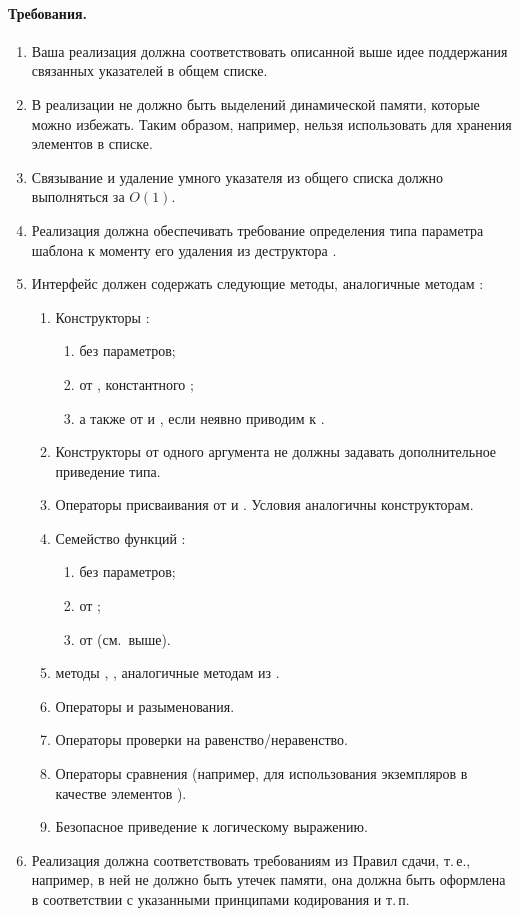 \documentclass[a4paper,10pt]{article}
\begin{document}
\paragraph{Требования.}
\begin{enumerate}
 \item Ваша реализация должна соответствовать описанной выше идее поддержания связанных указателей в общем списке.
 \item В реализации не должно быть выделений динамической памяти, которые можно избежать.
 Таким образом, например, нельзя использовать  для хранения элементов в списке.
 \item Связывание и удаление умного указателя из общего списка должно выполняться за $O(1)$.
 \item Реализация должна обеспечивать требование определения типа параметра шаблона к моменту его удаления из деструктора .
 \item Интерфейс  должен содержать следующие методы, аналогичные методам :
 \begin{enumerate}
  \item Конструкторы :
  \begin{enumerate}
   \item без параметров;
   \item от , константного ;
   \item а также от  и , если  неявно приводим к .
  \end{enumerate}
  \item Конструкторы от одного аргумента не должны задавать дополнительное приведение типа.
  \item Операторы присваивания от  и .
  Условия аналогичны конструкторам.
  \item Семейство функций :
   \begin{enumerate}
    \item без параметров;
    \item от ;
    \item от  (см.~выше).
   \end{enumerate}
  \item методы , ,  аналогичные методам из .
  \item Операторы \cpp{->} и разыменования.
  \item Операторы проверки на равенство/неравенство.
  \item Операторы сравнения (например, для использования экземпляров  в качестве элементов ).
  \item Безопасное приведение к логическому выражению.
 \end{enumerate}
 \item Реализация должна соответствовать требованиям из Правил сдачи,
 т.\,е., например, в ней не должно быть утечек памяти,
 она должна быть оформлена в соответствии с указанными принципами кодирования и т.\,п.
\end{enumerate}
\end{document}
